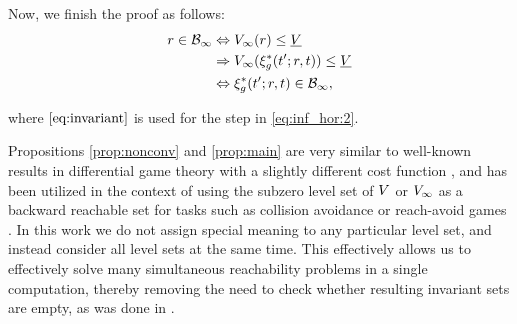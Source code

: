 \begin{IEEEproof}
Now, we finish the proof as follows:
\begin{subequations} \label{eq:inf_hor}
  \begin{align}
  \rstate \in \TEB_\infty &\Leftrightarrow \valfunc_\infty(\rstate) \le \underline\valfunc \\
  & \Rightarrow \valfunc_\infty(\rtraj^*(\tvar'; \rstate, \tvar)) \le \underline\valfunc \label{eq:inf_hor:2}\\
  & \Leftrightarrow \rtraj^*(\tvar'; \rstate, \tvar) \in \TEB_\infty,
  \end{align}
\end{subequations}

\noindent where $\eqref{eq:invariant}$ is used for the step in \eqref{eq:inf_hor:2}.

\end{IEEEproof} 
 \begin{rem} 
   Propositions \ref{prop:nonconv} and \ref{prop:main} are very similar to well-known results in differential game theory with a slightly different cost function \cite{Akametalu2014}, and has been utilized in the context of using the subzero level set of $V$ or $V_\infty$ as a backward reachable set for tasks such as collision avoidance or reach-avoid games \cite{Mitchell05}. In this work we do not assign special meaning to any particular level set, and instead consider all level sets at the same time. This effectively allows us to effectively solve many simultaneous reachability problems in a single computation, thereby removing the need to check whether resulting invariant sets are empty, as was done in \cite{Bansal2017}.
 \end{rem}